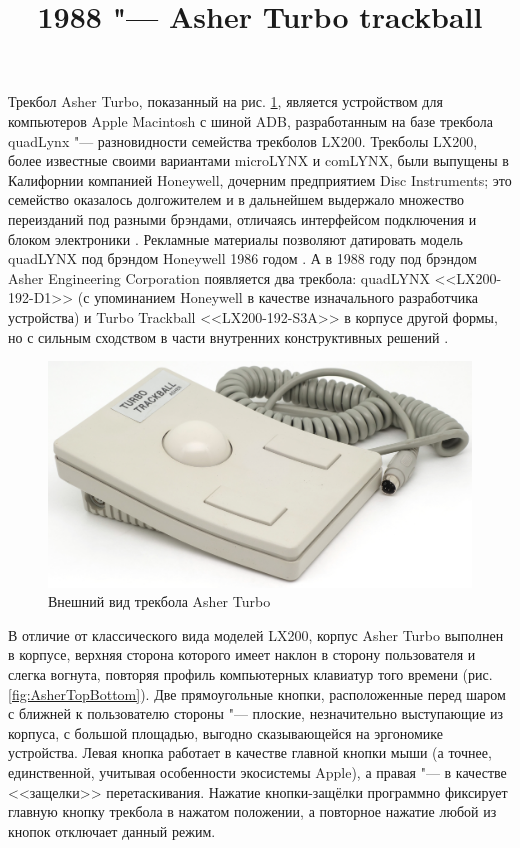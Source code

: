 \documentclass[11pt, a4paper]{article}
\begin{document}
\title{1988 "--- Asher Turbo trackball}
\date{}
\maketitle
{}
Трекбол Asher Turbo, показанный на рис. \ref{fig:AsherPic}, является устройством для компьютеров Apple Macintosh с шиной ADB, разработанным на базе трекбола quadLynx "--- разновидности семейства трекболов LX200. Трекболы LX200, более известные своими вариантами microLYNX и comLYNX, были выпущены в Калифорнии компанией Honeywell, дочерним предприятием Disc Instruments; это семейство оказалось долгожителем и в дальнейшем выдержало множество переизданий под разными брэндами, отличаясь интерфейсом подключения и блоком электроники \cite{lx200}. Рекламные материалы позволяют датировать модель quadLYNX под брэндом Honeywell 1986 годом \cite{honeywell}. А в 1988 году под брэндом Asher Engineering Corporation появляется два трекбола: quadLYNX <<LX200-192-D1>> (с упоминанием Honeywell в качестве изначального разработчика устройства) \cite{asher} и Turbo Trackball <<LX200-192-S3A>> в корпусе другой формы, но с сильным сходством в части внутренних конструктивных решений \cite{turbo}.

\begin{figure}[h]
    \centering
    \includegraphics[scale=0.58]{1988_asher_turbo_trackball/pic_60.jpg}
    \caption{Внешний вид трекбола Asher Turbo}
    \label{fig:AsherPic}
\end{figure}

В отличие от классического вида моделей LX200, корпус Asher Turbo выполнен в корпусе, верхняя сторона которого имеет наклон в сторону пользователя и слегка вогнута, повторяя профиль компьютерных клавиатур того времени (рис. \ref{fig:AsherTopBottom}). Две прямоугольные кнопки, расположенные перед шаром с ближней к пользователю стороны "--- плоские, незначительно выступающие из корпуса, с большой площадью, выгодно сказывающейся на эргономике устройства. Левая кнопка работает в качестве главной кнопки мыши (а точнее, единственной, учитывая особенности экосистемы Apple), а правая "--- в качестве <<защелки>> перетаскивания. Нажатие кнопки-защёлки программно фиксирует главную кнопку трекбола в нажатом положении, а повторное нажатие любой из кнопок отключает данный режим.
\end{document}
